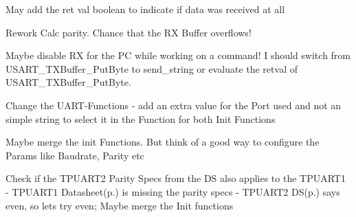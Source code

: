 \begin{DoxyRefList}
\item[\label{todo__todo000009}%
\hypertarget{todo__todo000009}{}%
Global \hyperlink{_u_a_r_t_8h_a6a0a1c62a63f3388c9d22c87a069ebe7}{receive\+\_\+string\+\_\+from\+\_\+usart} (U\+S\+A\+R\+T\+\_\+data\+\_\+t $\ast$\+U\+S\+A\+R\+T\+\_\+data, char $\ast$string)]May add the ret val boolean to indicate if data was received at all 
\item[\label{todo__todo000005}%
\hypertarget{todo__todo000005}{}%
Global \hyperlink{shell_8h_aa8061654c0af0c3c3fac9e63ed7eaed6}{send\+\_\+data} (void)]Rework Calc parity. Chance that the RX Buffer overflows! 
\item[\label{todo__todo000001}%
\hypertarget{todo__todo000001}{}%
File \hyperlink{shell_8c}{shell.c} ]Maybe disable RX for the PC while working on a command! I should switch from U\+S\+A\+R\+T\+\_\+\+T\+X\+Buffer\+\_\+\+Put\+Byte to send\+\_\+string or evaluate the retval of U\+S\+A\+R\+T\+\_\+\+T\+X\+Buffer\+\_\+\+Put\+Byte.  
\item[\label{todo__todo000006}%
\hypertarget{todo__todo000006}{}%
File \hyperlink{_u_a_r_t_8c}{U\+A\+RT.c} ]Change the U\+A\+R\+T-\/\+Functions -\/ add an extra value for the Port used and not an simple string to select it in the Function for both Init Functions  
\item[\label{todo__todo000008}%
\hypertarget{todo__todo000008}{}%
Global \hyperlink{_u_a_r_t_8h_a267c0b0bf7f4f8b70049d91449590cf8}{usart\+\_\+init\+\_\+pc} (void)]Maybe merge the init Functions. But think of a good way to configure the Params like Baudrate, Parity etc  
\item[\label{todo__todo000007}%
\hypertarget{todo__todo000007}{}%
Global \hyperlink{_u_a_r_t_8h_a09e438e4f709b00836cebb0d6a44f223}{usart\+\_\+init\+\_\+tpuart} (void)]Check if the T\+P\+U\+A\+R\+T2 Parity Specs from the DS also applies to the T\+P\+U\+A\+R\+T1 -\/ T\+P\+U\+A\+R\+T1 Datasheet(p.) is missing the parity specs -\/ T\+P\+U\+A\+R\+T2 DS(p.) says even, so lets try even; Maybe merge the Init functions 
\end{DoxyRefList}